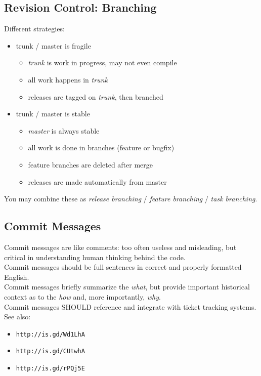\documentclass[xga]{xdvislides}
\begin{document}
\subsection{Revision Control: Branching}
Different strategies:
\begin{itemize}
	\item trunk / master is fragile
		\begin{itemize}
			\item {\em trunk} is work in progress, may not even compile
			\item all work happens in {\em trunk}
			\item releases are tagged on {\em trunk}, then branched
		\end{itemize}
	\item trunk / master is stable
		\begin{itemize}
			\item {\em master} is always stable
			\item all work is done in branches (feature or bugfix)
			\item feature branches are deleted after merge
			\item releases are made automatically from master
		\end{itemize}
\end{itemize}

You may combine these as {\em release branching} /
{\em feature branching} / {\em task branching}.

\subsection{Commit Messages}

Commit messages are like comments: too often useless
and misleading, but critical in understanding human
thinking behind the code. \\

Commit messages should be full sentences in correct
and properly formatted English. \\

Commit messages briefly summarize the {\em what}, but
provide important historical context as to the {\em
how} and, more importantly, {\em why}. \\

Commit messages SHOULD reference and integrate with
ticket tracking systems. \\

See also:
\begin{itemize}
	\item \verb+http://is.gd/Wd1LhA+
	\item \verb+http://is.gd/CUtwhA+
	\item \verb+http://is.gd/rPQj5E+
\end{itemize}
\end{document}
